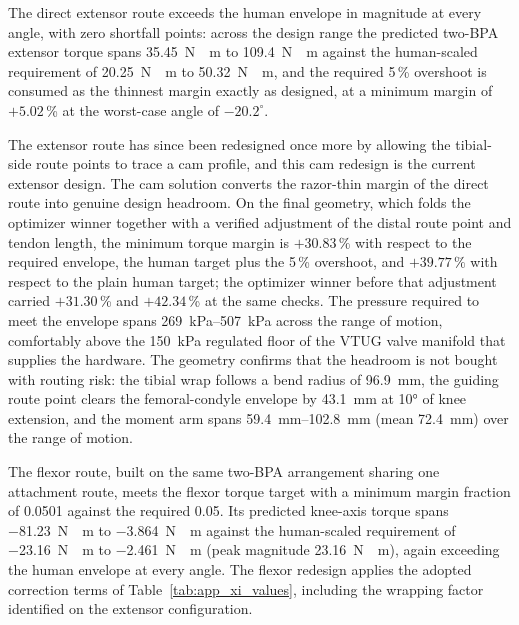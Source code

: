 The direct extensor route exceeds the human envelope in magnitude at every angle, with zero shortfall points: across the design range the predicted two-BPA extensor torque spans \qty{35.45}{\newton\cdot\meter} to \qty{109.4}{\newton\cdot\meter} against the human-scaled requirement of \qty{20.25}{\newton\cdot\meter} to \qty{50.32}{\newton\cdot\meter}, and the required 5\,\% overshoot is consumed as the thinnest margin exactly as designed, at a minimum margin of $+5.02$\,\% at the worst-case angle of $-20.2^{\circ}$.

The extensor route has since been redesigned once more by allowing the tibial-side route points to trace a cam profile, and this cam redesign is the current extensor design. The cam solution converts the razor-thin margin of the direct route into genuine design headroom. On the final geometry, which folds the optimizer winner together with a verified adjustment of the distal route point and tendon length, the minimum torque margin is $+30.83\,\%$ with respect to the required envelope, the human target plus the 5\,\% overshoot, and $+39.77\,\%$ with respect to the plain human target; the optimizer winner before that adjustment carried $+31.30$\,\% and $+42.34$\,\% at the same checks. The pressure required to meet the envelope spans \SIrange[range-phrase=--]{269}{507}{\kPa} across the range of motion, comfortably above the \qty{150}{\kPa} regulated floor of the VTUG valve manifold that supplies the hardware. The geometry confirms that the headroom is not bought with routing risk: the tibial wrap follows a bend radius of \qty{96.9}{\mm}, the guiding route point clears the femoral-condyle envelope by \qty{43.1}{\mm} at \ang{10} of knee extension, and the moment arm spans \SIrange[range-phrase=--]{59.4}{102.8}{\mm} (mean \qty{72.4}{\mm}) over the range of motion.

The flexor route, built on the same two-BPA arrangement sharing one attachment route, meets the flexor torque target with a minimum margin fraction of 0.0501 against the required 0.05. Its predicted knee-axis torque spans \qty{-81.23}{\newton\cdot\meter} to \qty{-3.864}{\newton\cdot\meter} against the human-scaled requirement of \qty{-23.16}{\newton\cdot\meter} to \qty{-2.461}{\newton\cdot\meter} (peak magnitude \qty{23.16}{\newton\cdot\meter}), again exceeding the human envelope at every angle. The flexor redesign applies the adopted correction terms of Table~\ref{tab:app_xi_values}, including the wrapping factor identified on the extensor configuration.

